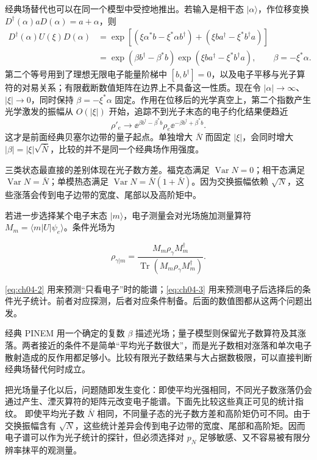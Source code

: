 经典场替代也可以在同一个模型中受控地推出。若输入是相干态 $|\alpha\rangle$，作位移变换 $D^\dagger(\alpha)aD(\alpha)=a+\alpha$，则
\begin{align*}
D^\dagger(\alpha)U(\xi)D(\alpha)
&=\exp\!\left[(\xi\alpha^*b-\xi^*\alpha b^\dagger)
 +(\xi ba^\dagger-\xi^*b^\dagger a)\right]\\
&=\exp(\beta b^\dagger-\beta^*b)
  \exp(\xi ba^\dagger-\xi^*b^\dagger a),
\qquad \beta=-\xi^*\alpha.
\end{align*}
第二个等号用到了理想无限电子能量阶梯中 $[b,b^\dagger]=0$，以及电子平移与光子算符的对易关系；有限截断数值矩阵在边界上不具备这一性质。现在令
$|\alpha|\to\infty$、$|\xi|\to0$，同时保持 $\beta=-\xi^*\alpha$ 固定。作用在位移后的光学真空上，第二个指数产生光学激发的振幅从 $O(|\xi|)$ 开始，追踪不到光子末态的电子约化结果便趋近
\begin{equation}
\rho'_e\longrightarrow
\ee^{\beta b^\dagger-\beta^*b}\rho_e
\ee^{-\beta b^\dagger+\beta^*b}.
\label{eq:quantum-controlled-classical-limit}
\end{equation}
这才是前面经典贝塞尔边带的量子起点。单独增大 $\bar N$ 而固定 $|\xi|$，会同时增大 $|\beta|=|\xi|\sqrt{\bar N}$，比较的并不是同一个经典场作用强度。

三类状态最直接的差别体现在光子数方差。福克态满足 $\operatorname{Var}N=0$；相干态满足 $\operatorname{Var}N=\bar N$；单模热态满足 $\operatorname{Var}N=\bar N(1+\bar N)$。因为交换振幅依赖 $\sqrt N$，这些涨落会传到电子边带的宽度、尾部以及高阶矩中。

若进一步选择某个电子末态 $|m\rangle$，电子测量会对光场施加测量算符 $M_m=\langle m|U|\psi_e\rangle$。条件光场为

\begin{equation}
\rho_{\gamma|m}=\frac{M_m\rho_\gamma M_m^\dagger}{\operatorname{Tr}(M_m\rho_\gamma M_m^\dagger)}.
\label{eq:ch04-3}
\end{equation}

\cref{eq:ch04-2} 用来预测“只看电子”时的能谱；\cref{eq:ch04-3} 用来预测电子后选择后的条件光子统计。前者对应探测，后者对应条件制备。后面的数值图都从这两个问题出发。

经典 PINEM 用一个确定的复数 $\beta$ 描述光场；量子模型则保留光子数算符及其涨落。两者接近的条件不是简单“平均光子数很大”，而是光子数相对涨落和单次电子散射造成的反作用都足够小。比较有限光子数结果与大占据数极限，可以直接判断经典场替代何时成立。

把光场量子化以后，问题随即发生变化：即使平均光强相同，不同光子数涨落仍会通过产生、湮灭算符的矩阵元改变电子能谱。下面先比较这些真正可见的统计指纹。
即使平均光子数 $\bar N$ 相同，不同量子态的光子数方差和高阶矩仍可不同。由于交换振幅含有 $\sqrt N$，这些统计差异会传到电子边带的宽度、尾部和高阶矩。因而电子谱可以作为光子统计的探针，但必须选择对 $p_N$ 足够敏感、又不容易被有限分辨率抹平的观测量。

